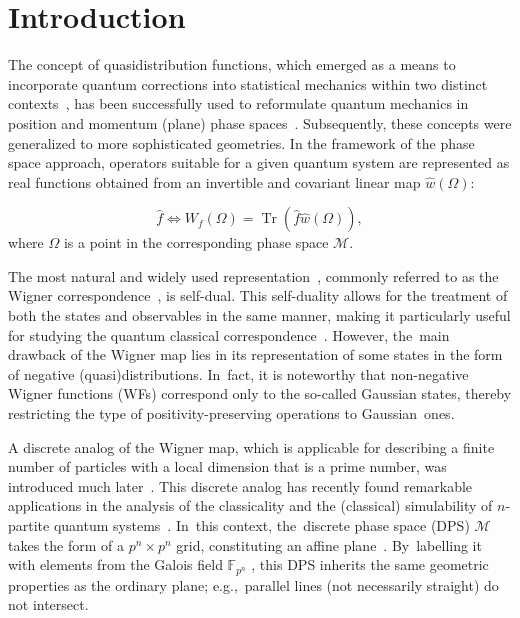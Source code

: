 \documentclass[quantumrep,article,accept,pdftex,moreauthors]{Definitions/mdpi}
\DeclareMathOperator{\Tr}{Tr}
\begin{document}
\section{Introduction\label{sec:1}}

The concept of quasidistribution functions, which emerged as a means to
incorporate quantum corrections into statistical mechanics within two distinct
contexts~\cite{wigner,bloch}, has been successfully used to reformulate quantum
mechanics in position and momentum (plane) phase spaces~\cite{groenewold,moyal}.
Subsequently, these concepts were generalized to more sophisticated geometries.
In the framework of the phase space approach, operators suitable for a given
quantum system are represented as real functions obtained from an invertible and
covariant linear map $\hat{w}(\Omega)$:

\begin{equation*}
  \hat{f}\Leftrightarrow W_{f}(\Omega)
  = \Tr\left(\hat{f}\hat{w}(\Omega)\right),
\end{equation*}
where $\Omega$ is a point in the corresponding phase space $\mathcal{M}$.

The most natural and widely used representation~\cite{qoptics,electron1,electron2}, commonly referred to as the Wigner
correspondence~\cite{wigner}, is self-dual. This self-duality allows for the
treatment of both the states and observables in the same manner, making it
particularly useful for studying the quantum classical correspondence~\cite{berry}. However, the~main drawback of the Wigner map lies in its
representation of some states in the form of negative (quasi)distributions. In~fact, it is noteworthy that non-negative Wigner functions (WFs) correspond only to
the so-called Gaussian states, thereby restricting the type of
positivity-preserving operations to Gaussian~ones.

A discrete analog of the Wigner map, which is applicable for describing a
finite number of particles with a local dimension that is a prime number,
was introduced much later~\cite{spin1, spin2,wootters1,gibbons}.
This discrete analog has recently found remarkable applications in the
analysis of the classicality and the (classical) simulability of $n$-partite
quantum systems~\cite{gottKnill, galvao, cormick, gross,WignerNegResource,
Raus17, UniqueWF, cohomo}. In~this context, the~discrete phase space (DPS)
$\mathcal{M}$ takes the form of a $p^{n}\times p^{n}$ grid, constituting an
affine plane~\cite{Saniga2004}. By~labelling it with elements from the Galois
field $\mathbb{F}_{p^{n}}$ , this DPS inherits the same geometric properties as
the ordinary plane; e.g.,~parallel lines (not necessarily straight) do not
intersect.
\end{document}
